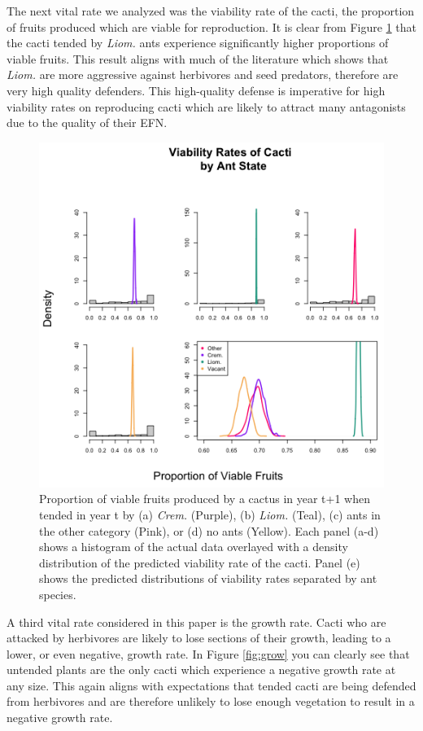 \documentclass[12pt,a4paper]{article}
\begin{document}
	The next vital rate we analyzed was the viability rate of the cacti, the proportion of fruits produced which are viable for reproduction. It is clear from Figure \ref{fig:viab} that the cacti tended by \textit{Liom.} ants experience significantly higher proportions of viable fruits. This result aligns with much of the literature which shows that \textit{Liom.} are more aggressive against herbivores and seed predators, therefore are very high quality defenders. This high-quality defense is imperative for high viability rates on reproducing cacti which are likely to attract many antagonists due to the quality of their EFN. 
	
	
	\begin{figure}[!ht]
	    \centering
	    \includegraphics{Figures/viab_hist.png}
	    \caption{Proportion of viable fruits produced by a cactus in year t+1 when tended in year t by (a) \textit{Crem.} (Purple), (b) \textit{Liom.} (Teal), (c) ants in the other category (Pink), or (d) no ants (Yellow). Each panel (a-d) shows a histogram of the actual data overlayed with a density distribution of the predicted viability rate of the cacti. Panel (e) shows the predicted distributions of viability rates separated by ant species.}
	    \label{fig:viab}
	\end{figure}
	
	A third vital rate considered in this paper is the growth rate. Cacti who are attacked by herbivores are likely to lose sections of their growth, leading to a lower, or even negative, growth rate. In Figure \ref{fig:grow} you can clearly see that untended plants are the only cacti which experience a negative growth rate at any size. This again aligns with expectations that tended cacti are being defended from herbivores and are therefore unlikely to lose enough vegetation to result in a negative growth rate. 
	
\end{document}
